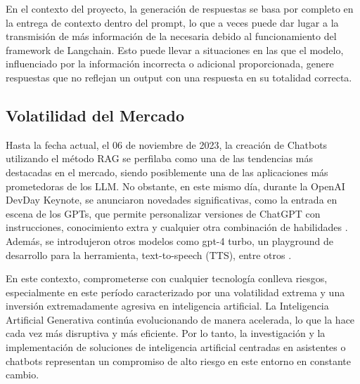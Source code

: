 En el contexto del proyecto, la generación de respuestas se basa por completo en la entrega de contexto 
dentro del prompt, lo que a veces puede dar lugar a la transmisión de más información de la necesaria 
debido al funcionamiento del framework de Langchain. Esto puede llevar a situaciones en las que el modelo, 
influenciado por la información incorrecta o adicional proporcionada, genere respuestas que no reflejan 
un output con una respuesta en su totalidad correcta.

\subsection{Volatilidad del Mercado}

Hasta la fecha actual, el 06 de noviembre de 2023, la creación de Chatbots utilizando el método RAG se perfilaba como 
una de las tendencias más destacadas en el mercado, siendo posiblemente una de las aplicaciones más prometedoras de los LLM. 
No obstante, en este mismo día, durante la OpenAI DevDay Keynote, se anunciaron novedades significativas, como la entrada en 
escena de los GPTs, que permite personalizar versiones de ChatGPT con instrucciones, conocimiento extra y cualquier otra combinación 
de habilidades \cite{openai2}. Además, se introdujeron otros modelos como gpt-4 turbo, un playground de desarrollo para la herramienta, 
text-to-speech (TTS), entre otros \cite{openai3}.

En este contexto, comprometerse con cualquier tecnología conlleva riesgos, especialmente en este período caracterizado por una 
volatilidad extrema y una inversión extremadamente agresiva en inteligencia artificial. La Inteligencia Artificial Generativa 
continúa evolucionando de manera acelerada, lo que la hace cada vez más disruptiva y más eficiente. Por lo tanto, la investigación 
y la implementación de soluciones de inteligencia artificial centradas en asistentes o chatbots representan un compromiso de alto 
riesgo en este entorno en constante cambio.





